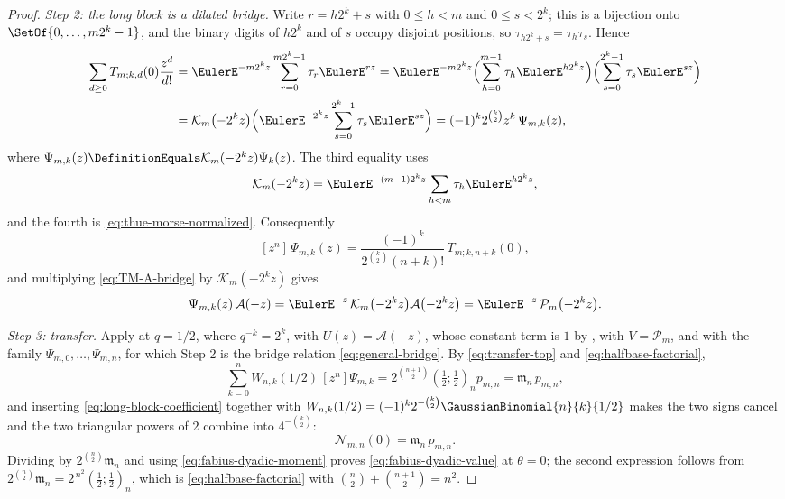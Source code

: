 \documentclass[11pt,a4paper,oneside,openany]{book}
\theoremstyle{definition}
\theoremstyle{remark}
\begin{document}
\begin{proof}
\emph{Step 2: the long block is a dilated bridge.}  Write $r=h2^k+s$ with
$0\le h<m$ and $0\le s<2^k$; this is a bijection onto $\SetOf{0,\ldots,m2^k-1}$, and the
binary digits of $h2^k$ and of $s$ occupy disjoint positions, so
$\tau_{h2^k+s}=\tau_h\tau_s$.  Hence
\begin{align*}
 \sum_{d\ge0}T_{m;k,d}(0)\frac{z^d}{d!}
 &=\EulerE^{-m2^kz}\sum_{r=0}^{m2^k-1}\tau_r\EulerE^{rz}
  =\EulerE^{-m2^kz}
   \Bigl(\sum_{h=0}^{m-1}\tau_h\EulerE^{h2^kz}\Bigr)
   \Bigl(\sum_{s=0}^{2^k-1}\tau_s\EulerE^{sz}\Bigr)\\
 &=\mathcal K_m\bigl(-2^kz\bigr)
   \Bigl(\EulerE^{-2^kz}\sum_{s=0}^{2^k-1}\tau_s\EulerE^{sz}\Bigr)
  =(-1)^k2^{\binom k2}z^k\,\Psi_{m,k}(z),
\end{align*}
where $\Psi_{m,k}(z)\DefinitionEquals\mathcal K_m(-2^kz)\Psi_k(z)$.  The third equality
uses
\[
 \mathcal K_m(-2^kz)
 =\EulerE^{-(m-1)2^kz}\sum_{h<m}\tau_h\EulerE^{h2^kz},
\]
and the fourth is \eqref{eq:thue-morse-normalized}.  Consequently
\begin{equation}\label{eq:long-block-coefficient}
 [z^n]\,\Psi_{m,k}(z)
 =\frac{(-1)^k}{2^{\binom k2}(n+k)!}\,T_{m;k,n+k}(0),
\end{equation}
and multiplying \eqref{eq:TM-A-bridge} by $\mathcal K_m(-2^kz)$ gives
\[
 \Psi_{m,k}(z)\,\mathcal A(-z)
 =\EulerE^{-z}\,\mathcal K_m\bigl(-2^kz\bigr)\mathcal A\bigl(-2^kz\bigr)
 =\EulerE^{-z}\,\mathcal P_m\bigl(-2^kz\bigr).
\]

\emph{Step 3: transfer.}  Apply  at $q=1/2$,
where $q^{-k}=2^k$, with $U(z)=\mathcal A(-z)$, whose constant term is $1$ by
, with $V=\mathcal P_m$, and with the family
$\Psi_{m,0},\ldots,\Psi_{m,n}$, for which Step 2 is the bridge relation
\eqref{eq:general-bridge}.  By \eqref{eq:transfer-top} and \eqref{eq:halfbase-factorial},
\[
 \sum_{k=0}^{n}W_{n,k}(1/2)\,[z^n]\Psi_{m,k}
 =2^{\binom{n+1}{2}}\left(\tfrac12;\tfrac12\right)_np_{m,n}
 =\mathfrak m_n\,p_{m,n},
\]
and inserting \eqref{eq:long-block-coefficient} together with
$W_{n,k}(1/2)=(-1)^k2^{-\binom k2}\GaussianBinomial{n}{k}{1/2}$ makes the two signs cancel and the
two triangular powers of $2$ combine into $4^{-\binom k2}$:
\[
 \mathcal N_{m,n}(0)=\mathfrak m_n\,p_{m,n}.
\]
Dividing by $2^{\binom n2}\mathfrak m_n$ and using \eqref{eq:fabius-dyadic-moment}
proves \eqref{eq:fabius-dyadic-value} at $\theta=0$; the second expression follows from
$2^{\binom n2}\mathfrak m_n=2^{\,n^2}\left(\tfrac12;\tfrac12\right)_n$, which is
\eqref{eq:halfbase-factorial} with $\binom n2+\binom{n+1}{2}=n^2$.


\end{proof}
\end{document}
